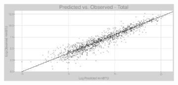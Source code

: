 \FloatBarrier
\newpage
\begin{figure}
\begin{subfigure}{1\textwidth}
\centering
\includegraphics[width=.99\textwidth, height=0.6\textheight, angle=90, origin=c]{Images/electricity_psf_nn_full_pvo_transformed.png}
\end{subfigure}
\end{figure}
\FloatBarrier
\newpage

